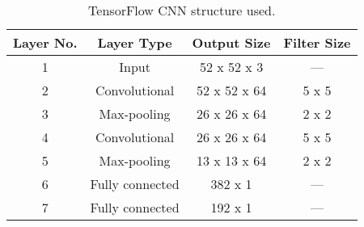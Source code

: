 \begin{table}
\centering \caption{TensorFlow CNN structure used.} \label{tab:layers}
 \normalsize
     \begin{tabular}{c c c c}
         \hline
         Layer No. & Layer Type      & Output Size & Filter Size \\ \hline
         1         & Input           & 52 x 52 x 3 &  ---\\
         2         & Convolutional   & 52 x 52 x 64 & 5 x 5 \\
         3         & Max-pooling     & 26 x 26 x 64 & 2 x 2 \\
         4         & Convolutional   & 26 x 26 x 64 &  5 x 5 \\
         5         & Max-pooling     & 13 x 13 x 64 &  2 x 2 \\
         6         & Fully connected & 382 x 1 & --- \\
         7         & Fully connected & 192 x 1 & --- \\
         \hline
     \end{tabular}
 \end{table}

